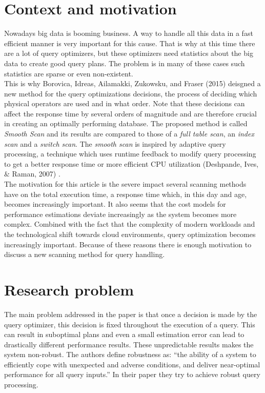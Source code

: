 \documentclass[a4paper,11pt,titlepage]{article}
\begin{document}
\section{Context and motivation}
Nowadays big data is booming business. A way to handle all this data in a fast efficient manner is very important for this cause. That is why at this time there are a lot of query optimizers, but these optimizers need statistics about the big data to create good query plans. The problem is in many of these cases such statistics are sparse or even non-existent. \\
This is why Borovica, Idreas, Ailamakki, Zukowsku, and Fraser (2015) \cite{smoothscan} deisgned a new method for the query optimizations decisions, the process of deciding which physical operators are used and in what order. Note that these decisions can affect the response time by several orders of magnitude and are therefore crucial in creating an optimally performing database. The proposed method is called \emph{Smooth Scan} and its results are compared to those of a \emph{full table scan}, an \emph{index scan} and a \emph{switch scan}. The \emph{smooth scan} is inspired by adaptive query processing, a technique which uses runtime feedback to modify query processing to get a better response time or more efficient CPU utilization (Deshpande, Ives, $\&$ Raman, 2007) \cite{query}.\\
The motivation for this article is the severe impact several scanning methods have on the total execution time, a response time which, in this day and age, becomes increasingly important. It also seems that the cost models for performance estimations deviate increasingly as the system becomes more complex. Combined with the fact that the complexity of modern workloads and the technological shift towards cloud environments, query optimization becomes increasingly important. Because of these reasons there is enough motivation to discuss a new scanning method for query handling.


\section{Research problem}
The main problem addressed in the paper is that once a decision is made by the query optimizer, this decision is fixed throughout the execution of a query. This can result in suboptimal plans and even a small estimation error can lead to drastically different performance results. These unpredictable results makes the system non-robust. The authors define robustness as: “the ability of a system to efficiently cope with unexpected and adverse conditions, and deliver near-optimal performance for all query inputs.” In their paper they try to achieve robust query processing.
\end{document}
